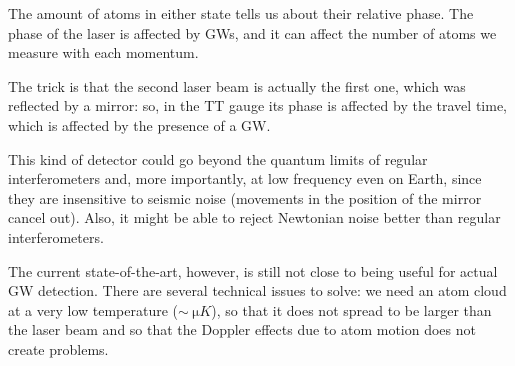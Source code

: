 \documentclass[main.tex]{subfiles}
\begin{document}
The amount of atoms in either state tells us about their relative phase. 
The phase of the laser is affected by GWs, and it can affect the number of atoms we measure with each momentum. 

The trick is that the second laser beam is actually the first one, which was reflected by a mirror: so, in the TT gauge its phase is affected by the travel time, which is affected by the presence of a GW. 

This kind of detector could go beyond the quantum limits of regular interferometers and, more importantly, at low frequency even on Earth, since they are insensitive to seismic noise (movements in the position of the mirror cancel out). 
Also, it might be able to reject Newtonian noise better than regular interferometers. 

The current state-of-the-art, however, is still not close to being useful for actual GW detection. 
There are several technical issues to solve: we need an atom cloud at a very low temperature (\(\sim \SI{}{\micro K}\)), so that it does not spread to be larger than the laser beam and so that the Doppler effects due to atom motion  does not create problems. 
\end{document}
